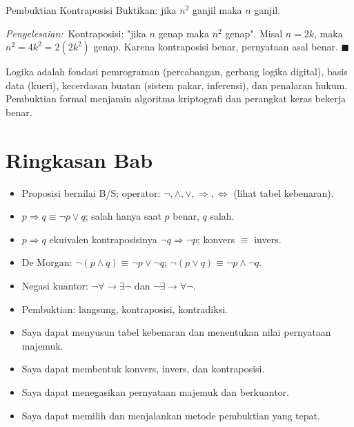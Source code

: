 \documentclass[11pt,a4paper]{report}
\theoremstyle{gaya}
\newcommand{\jawab}{\par\smallskip\noindent\textit{\textcolor{oranye}{Penyelesaian:}}\ }
\newcommand{\cek}{\ding{113}\ } %
\begin{document}
\begin{contoh}{Pembuktian Kontraposisi}
Buktikan: jika $n^2$ ganjil maka $n$ ganjil.

\jawab Kontraposisi: "jika $n$ genap maka $n^2$ genap". Misal $n=2k$, maka $n^2=4k^2=2(2k^2)$ genap. Karena kontraposisi benar, pernyataan asal benar. $\blacksquare$
\end{contoh}

\begin{dunianyata}
Logika adalah fondasi pemrograman (percabangan, gerbang logika digital), basis data (kueri), kecerdasan buatan (sistem pakar, inferensi), dan penalaran hukum. Pembuktian formal menjamin algoritma kriptografi dan perangkat keras bekerja benar.
\end{dunianyata}

\section*{Ringkasan Bab}
\begin{itemize}[leftmargin=*,topsep=2pt]
  \item Proposisi bernilai B/S; operator: $\lnot,\wedge,\vee,\Rightarrow,\Leftrightarrow$ (lihat tabel kebenaran).
  \item $p\Rightarrow q\equiv\lnot p\vee q$; salah hanya saat $p$ benar, $q$ salah.
  \item $p\Rightarrow q$ ekuivalen kontraposisinya $\lnot q\Rightarrow\lnot p$; konvers $\equiv$ invers.
  \item De Morgan: $\lnot(p\wedge q)\equiv\lnot p\vee\lnot q$; $\lnot(p\vee q)\equiv\lnot p\wedge\lnot q$.
  \item Negasi kuantor: $\lnot\forall\to\exists\lnot$ dan $\lnot\exists\to\forall\lnot$.
  \item Pembuktian: langsung, kontraposisi, kontradiksi.
\end{itemize}

\begin{refleksi}
\begin{itemize}[leftmargin=*,topsep=2pt]
  \item[\cek] Saya dapat menyusun tabel kebenaran dan menentukan nilai pernyataan majemuk.
  \item[\cek] Saya dapat membentuk konvers, invers, dan kontraposisi.
  \item[\cek] Saya dapat menegasikan pernyataan majemuk dan berkuantor.
  \item[\cek] Saya dapat memilih dan menjalankan metode pembuktian yang tepat.
\end{itemize}
\end{refleksi}
\end{document}
